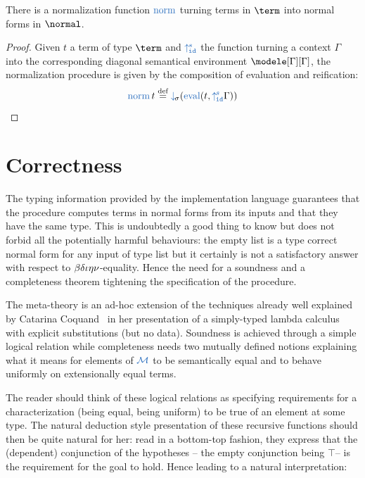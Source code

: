 \documentclass[preprint]{sigplanconf}
\begin{document}
\begin{corollary}There is a normalization function $\norm$ turning terms in
$\term$ into normal forms in $\normal$.
\end{corollary}
\begin{proof} Given $t$ a term of type $\term$ and $\reflecte$ the function
turning a context $\Gamma$ into the corresponding diagonal semantical
environment $\modele[\Gamma][\Gamma]$, the normalization procedure is given
by the composition of evaluation and reification:
$$\norm t \eqdef \reify (\termeval (t , \reflecte \Gamma))$$
\end{proof}







\section{Correctness}
\label{correctness-proof}

The typing information provided by the implementation language guarantees that
the procedure computes terms in normal forms from its inputs and that they have
the same type. This is undoubtedly a good thing to know but does not forbid all
the potentially harmful behaviours: the empty list is a type correct normal form
for any input of type list but it certainly is not a satisfactory answer with
respect to $\operatorname{\beta\delta\iota\eta\nu}$-equality. Hence the need for a soundness and a completeness
theorem tightening the specification of the procedure.

The meta-theory is an ad-hoc extension of the techniques already well explained
by Catarina Coquand~\cite{Coquand02} in her presentation of a simply-typed lambda
calculus with explicit substitutions (but no data). Soundness is achieved through
a simple logical relation while completeness needs two mutually defined notions
explaining what it means for elements of $\NBE$ to be semantically equal and to
behave uniformly on extensionally equal terms.

The reader should think of these logical relations as specifying requirements for
a characterization (being equal, being uniform) to be true of an element at some
type. The natural deduction style presentation of these recursive functions should
then be quite natural for her: read in a bottom-top fashion, they express that
the (dependent) conjunction of the hypotheses -- the empty conjunction being $\top$--
is the requirement for the goal to hold. Hence leading to a natural interpretation:
\begin{mathpar}\end{mathpar}
\end{document}

